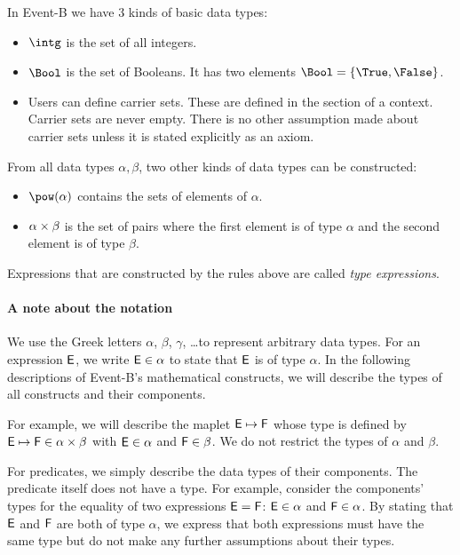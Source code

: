 In Event-B we have 3 kinds of basic data types:
\begin{itemize}
\item {} $\intg$ is the set of all integers.
\item {}
  $\Bool$ is the set of Booleans. 
  It has two elements $\Bool = \{\True,\False\}$.
\item {}
  Users can define carrier sets. 
  These are defined in the  section of a context.
  Carrier sets are never empty.
  There is no other assumption made about carrier sets unless it is stated explicitly as
  an axiom.
\end{itemize}
From all data types $\alpha, \beta$, two other kinds of data types can be constructed:
\begin{itemize}
\item $\pow(\alpha)$ contains the sets of elements of $\alpha$.
\item {} $\alpha\mathbin\times\beta$ is the set of pairs where the first element is of type $\alpha$ and the
  second element is of type $\beta$.
\end{itemize}
 Expressions that are constructed by the rules above are called \emph{type expressions}.

\paragraph{A note about the notation}
We use the Greek letters $\alpha$, $\beta$, $\gamma$, \ldots to represent arbitrary data types.
For an expression $\textsf{E}$, we write $\textsf{E}\in\alpha$ to state that $\textsf{E}$ is of type $\alpha$.
In the following descriptions of Event-B's mathematical constructs, we will describe the
  types of all constructs and their components.

For example, we will describe the maplet $\textsf{E}\mapsto \textsf{F}$ whose type is defined by $\textsf{E}\mapsto \textsf{F}\in\alpha\mathbin\times\beta$ with
 $\textsf{E}\in\alpha$ and $\textsf{F}\in\beta$. We do not restrict the types of $\alpha$ and $\beta$.

For predicates, we simply describe the data types of their components. 
The predicate itself does not have a type.
For example, consider the components' types for the equality of two expressions $\textsf{E}=\textsf{F}$: $\textsf{E}\in\alpha$ and $\textsf{F}\in\alpha$.
By stating that $\textsf{E}$ and $\textsf{F}$ are both of type $\alpha$, we express that both expressions must have the
  same type but do not make any further assumptions about their types.

